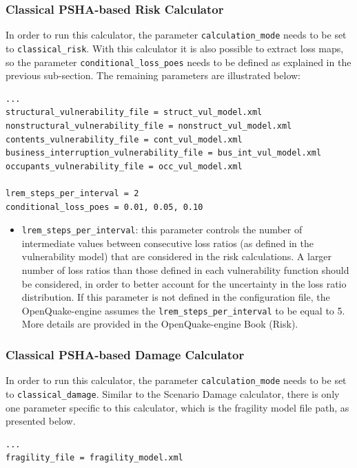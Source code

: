 \subsubsection{Classical PSHA-based Risk Calculator}
In order to run this calculator, the parameter \Verb+calculation_mode+ needs to be set to \Verb+classical_risk+. With this calculator it is also possible to extract loss maps, so the parameter \Verb+conditional_loss_poes+ needs to be defined as explained in the previous sub-section. The remaining parameters are illustrated below:
\begin{Verbatim}[frame=single, commandchars=\\\{\}, samepage=true]
...
structural_vulnerability_file = struct_vul_model.xml
nonstructural_vulnerability_file = nonstruct_vul_model.xml
contents_vulnerability_file = cont_vul_model.xml
business_interruption_vulnerability_file = bus_int_vul_model.xml
occupants_vulnerability_file = occ_vul_model.xml

lrem_steps_per_interval = 2
conditional_loss_poes = 0.01, 0.05, 0.10
\end{Verbatim}

\begin{itemize}
\item  \Verb+lrem_steps_per_interval+: this parameter controls the number of intermediate values between consecutive loss ratios (as defined in the \gls{vulnerability model}) that are considered in the risk calculations. A larger number of loss ratios than those defined in each \gls{vulnerability function} should be considered, in order to better account for the uncertainty in the loss ratio distribution. If this parameter is not defined in the configuration file, the OpenQuake-engine assumes the \Verb+lrem_steps_per_interval+ to be equal to 5. More details are provided in the OpenQuake-engine Book (Risk).
\end{itemize}


\subsubsection{Classical PSHA-based Damage Calculator}
In order to run this calculator, the parameter \Verb+calculation_mode+ needs to be set to \Verb+classical_damage+. Similar to the Scenario Damage calculator, there is only one parameter specific to this calculator, which is the \gls{fragility model} file path, as presented below.
\begin{Verbatim}[frame=single, commandchars=\\\{\}, samepage=true]
...
fragility_file = fragility_model.xml
\end{Verbatim}

